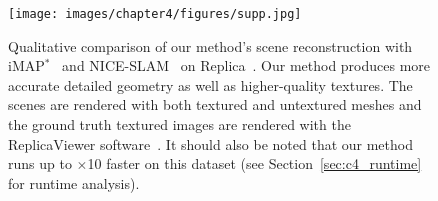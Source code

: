 \begin{figure}[t]
    \begin{center}
        \texttt{[image: images/chapter4/figures/supp.jpg]}
    \end{center}
    \caption{Qualitative comparison of our method's scene reconstruction with iMAP$^*$~\citep{sucar2021imap} and NICE-SLAM~\citep{zhu2022nice} on Replica~\citep{replica19arxiv}. Our method produces more accurate detailed geometry as well as higher-quality textures. The scenes are rendered with both textured and untextured meshes and the ground truth textured images are rendered with the ReplicaViewer software~\citep{replica19arxiv}. It should also be noted that our method runs up to $\times$10 faster on this dataset (see Section~\ref{sec:c4_runtime} for runtime analysis).}
    \label{fig:c4_supp}
\end{figure}


